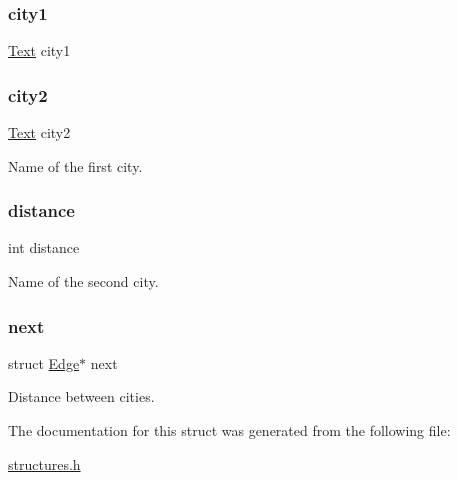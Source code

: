 \subsubsection{\texorpdfstring{city1}{city1}}
{\footnotesize\ttfamily \mbox{\hyperlink{structures_8h_a40c368b38c251b762d65bf9a9703c4b0}{Text}} city1}

\mbox{\label{struct_edge_ac354e2207d98056e2aa26e4d87931b7b}} 
\subsubsection{\texorpdfstring{city2}{city2}}
{\footnotesize\ttfamily \mbox{\hyperlink{structures_8h_a40c368b38c251b762d65bf9a9703c4b0}{Text}} city2}



Name of the first city. 

\mbox{\label{struct_edge_afb9412686cd344ad61757c1c19ba8a87}} 
\subsubsection{\texorpdfstring{distance}{distance}}
{\footnotesize\ttfamily int distance}



Name of the second city. 

\mbox{\label{struct_edge_a556c4bee2736c58d0261c100ee43b50d}} 
\subsubsection{\texorpdfstring{next}{next}}
{\footnotesize\ttfamily struct \mbox{\hyperlink{struct_edge}{Edge}}$\ast$ next}



Distance between cities. 



The documentation for this struct was generated from the following file\+:\begin{DoxyCompactItemize}
\item 
\mbox{\hyperlink{structures_8h}{structures.\+h}}\end{DoxyCompactItemize}
